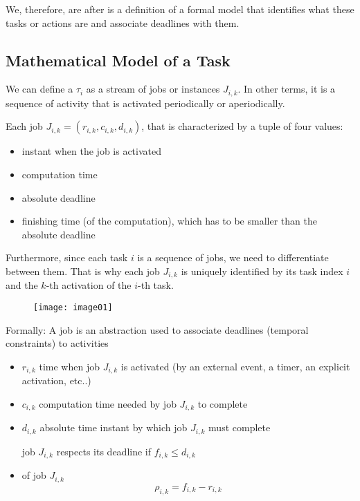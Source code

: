 We, therefore, are after is a definition of a formal model that identifies what these tasks or actions are and associate deadlines with them. 
\subsection{Mathematical Model of a Task}
We can define a  $\tau_i$ as a stream of jobs or instances $J_{i,k}$. In other terms, it is a sequence of activity that is activated periodically or aperiodically.

Each job $J_{i,k} = (r_{i,k}, c_{i,k}, d_{i,k})$, that is characterized by a tuple of four values:
\begin{itemize}
\item{instant when the job is activated}
\item{computation time}
\item{absolute deadline}
\item{finishing time (of the computation), which has to be smaller than the absolute deadline}
\end{itemize}

Furthermore, since each task $i$ is a sequence of jobs, we need to differentiate between them. That is why each job $J_{i,k}$ is uniquely identified by its task index $i$ and the $k$-th activation of the $i$-th task.

\begin{figure}[!h]
\centering
\texttt{[image: image01]}
\end{figure}

Formally:
A job is an abstraction used to associate deadlines (temporal constraints) to activities
\begin{itemize}
\item $r_{i,k}$ time when job $J_{i,k}$ is activated (by an external event, a timer, an explicit activation, etc..)
\item $c_{i,k}$ computation time needed by job $J_{i,k}$ to complete
\item $d_{i,k}$ absolute time instant by which job $J_{i,k}$ must complete 

job $J_{i,k}$ respects its deadline if $f_{i,k} \le d_{i,k}$
\item {} of job $J_{i,k}$
\[\rho_{i,k} = f_{i,k} - r_{i,k}\]
\end{itemize}

